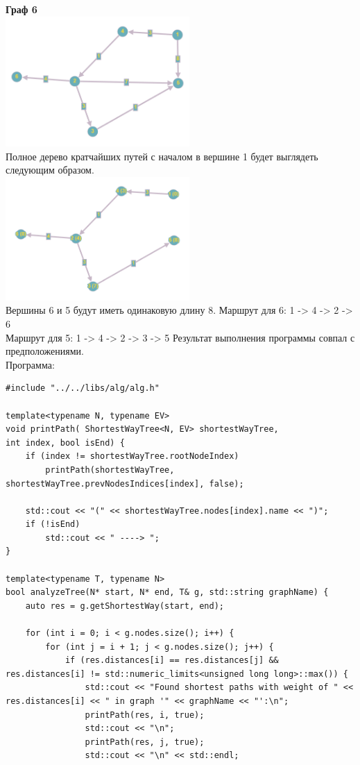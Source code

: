 \documentclass[a4paper,14pt]{extarticle}
\begin{document}
\begin{enumerate}[1.]
        \textbf{Граф 6}\\
        \includegraphics[width=70mm]{testTree6Before}\\
        Полное дерево кратчайших путей с началом в вершине 1 будет выглядеть следующим образом.\\
        \includegraphics[width=70mm]{testTree6After}\\
        Вершины 6 и 5 будут иметь одинаковую длину 8.\bigbreak
        Маршрут для 6: 1 -> 4 -> 2 -> 6\\
        Маршрут для 5: 1 -> 4 -> 2 -> 3 -> 5\bigbreak
        Результат выполнения программы совпал с предположениями.\\

        Программа:
        \begin{verbatim}
#include "../../libs/alg/alg.h"

template<typename N, typename EV>
void printPath( ShortestWayTree<N, EV> shortestWayTree, 
int index, bool isEnd) {
    if (index != shortestWayTree.rootNodeIndex)
        printPath(shortestWayTree, shortestWayTree.prevNodesIndices[index], false);

    std::cout << "(" << shortestWayTree.nodes[index].name << ")";
    if (!isEnd)
        std::cout << " ----> ";
}

template<typename T, typename N>
bool analyzeTree(N* start, N* end, T& g, std::string graphName) {
    auto res = g.getShortestWay(start, end);
    
    for (int i = 0; i < g.nodes.size(); i++) {
        for (int j = i + 1; j < g.nodes.size(); j++) {
            if (res.distances[i] == res.distances[j] && res.distances[i] != std::numeric_limits<unsigned long long>::max()) {
                std::cout << "Found shortest paths with weight of " << res.distances[i] << " in graph '" << graphName << "':\n";
                printPath(res, i, true);
                std::cout << "\n";
                printPath(res, j, true);
                std::cout << "\n" << std::endl;


\end{verbatim}
\end{enumerate}
\end{document}
